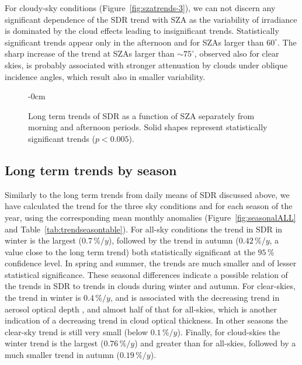 \documentclass[applsci,article,submit,moreauthors,pdftex]{Definitions/mdpi}
\begin{document}
For cloudy-sky conditions (Figure~\ref{fig:szatrends-3}), we can not
discern any significant dependence of the SDR trend with SZA as the
variability of irradiance is dominated by the cloud effects leading to
insignificant trends. Statistically significant trends appear only in
the afternoon and for SZAs larger than \(60^\circ\). The sharp increase
of the trend at SZAs larger than \(\sim{75}^{\circ}\), observed also for
clear skies, is probably associated with stronger attenuation by clouds
under oblique incidence angles, which result also in smaller
variability.

\begin{figure}[h!]
    \begin{adjustwidth}{-\extralength}{0cm}
        {\centering 
            \hfill
            \hfill
        }
        \caption{Long term trends of SDR as a function of SZA separately from morning and afternoon periods. Solid shapes  represent statistically significant trends ($p < 0.005$).}\label{fig:szatrends}
    \end{adjustwidth}
\end{figure}

\hypertarget{long-term-trends-by-season}{%
\subsection{Long term trends by
season}\label{long-term-trends-by-season}}

Similarly to the long term trends from daily means of SDR discussed
above, we have calculated the trend for the three sky conditions and for
each season of the year, using the corresponding mean monthly anomalies
(Figure~\ref{fig:seasonalALL} and Table~\ref{tab:trendseasontable}). For
all-sky conditions the trend in SDR in winter is the largest
(\(0.7\,\%/y\)), followed by the trend in autumn (\(0.42\,\%/y\), a
value close to the long term trend) both statistically significant at
the \(95\,\%\) confidence level. In spring and summer, the trends are
much smaller and of lesser statistical significance. These seasonal
differences indicate a possible relation of the trends in SDR to trends
in clouds during winter and autumn. For clear-skies, the trend in winter
is \(0.4\,\%/y\), and is associated with the decreasing trend in aerosol
optical depth \citep{Siomos2020}, and almost half of that for all-skies,
which is another indication of a decreasing trend in cloud optical
thickness. In other seasons the clear-sky trend is still very small
(below \(0.1\,\%/y\)). Finally, for cloud-skies the winter trend is the
largest (\(0.76\,\%/y\)) and greater than for all-skies, followed by a
much smaller trend in autumn (\(0.19\,\%/y\)).
\end{document}
